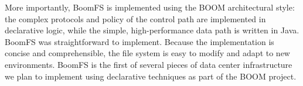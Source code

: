 \documentclass[twocolumn]{article}
\begin{document}
More importantly, BoomFS is implemented using the BOOM architectural
style: the complex protocols and policy of the control path are
implemented in declarative logic, while the simple, high-performance
data path is written in Java. BoomFS was straightforward to
implement. Because the implementation is concise and comprehensible,
the file system is easy to modify and adapt to new environments. BoomFS
is the first of several pieces of data center infrastructure we plan
to implement using declarative techniques as part of the BOOM project.



\end{document}
